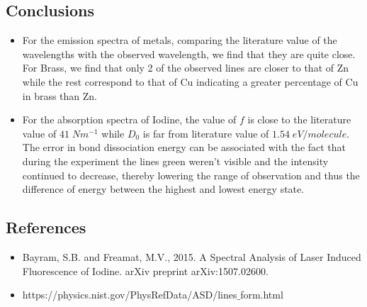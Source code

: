 \documentclass[9pt,a4paper]{article}
\begin{document}
\begin{multicols*}{2}
\subsection{Conclusions}
\begin{itemize}
\item For the emission spectra of metals, comparing the literature value of the wavelengths with the observed wavelength, we find that they are quite close. For Brass, we find that only 2 of the observed lines are closer to that of Zn while the rest correspond to that of Cu indicating a greater percentage of Cu in brass than Zn.
\item For the absorption spectra of Iodine, the value of $f$ is close to the literature value of $41\; N m^{-1}$ while $D_0$ is far from literature value of $1.54\;eV/molecule$. The error in bond dissociation energy can be associated with the fact that during the experiment the lines green weren't visible and the 	intensity continued to decrease, thereby lowering the range of observation and thus the difference of energy between the highest and lowest energy state.
\end{itemize}
\subsection{References}
\begin{itemize}
\item Bayram, S.B. and Freamat, M.V., 2015. A Spectral Analysis of Laser Induced Fluorescence of Iodine. arXiv preprint arXiv:1507.02600.
\item https://physics.nist.gov/PhysRefData/ASD/lines$\_$form.html
\end{itemize}

\end{multicols*}
\end{document}
